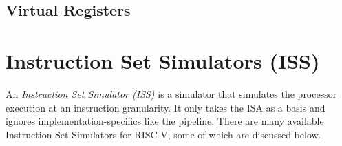 \subsection{Virtual Registers}




\section{Instruction Set Simulators (ISS) }
\label{sec:bg_iss}

An \textit{Instruction Set Simulator (ISS)} is a simulator that simulates the processor execution at an instruction granularity.
It only takes the ISA as a basis and ignores implementation-specifics like the pipeline.
There are many available Instruction Set Simulators for RISC-V, some of which are discussed below.


